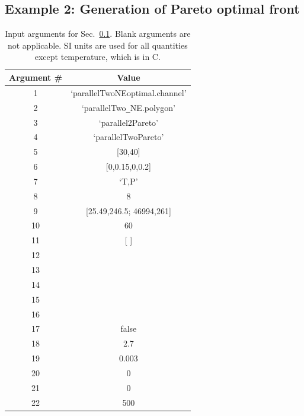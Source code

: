 \documentclass[11pt,letterpaper]{article}
\begin{document}
\subsection{Example 2: Generation of Pareto optimal front}
\label{subsec_Pareto_parallelTwo}
\begin{table}[!h]
\caption{Input arguments for Sec.\ \ref{subsec_Pareto_parallelTwo}.  Blank arguments are not applicable. SI units are used for all quantities except temperature, which is in \degree C.}
\label{tab_generate_pareto_front_inputs1}
\centering
\begin{tabular}{|c|c|}
\hline
Argument \# & Value \\
\hline
1 & `parallelTwoNEoptimal.channel'\\
\hline
2 & `parallelTwo\texttt{\_}NE.polygon' \\
\hline
3 & `parallel2Pareto' \\
\hline
4 &  `parallelTwoPareto' \\
\hline
5 & [30,40] \\
\hline
6 & [0,0.15,0,0.2] \\
\hline
7 & `T,P' \\
\hline
8 & 8 \\
\hline
9 & [25.49,246.5; 46994,261]\\
\hline
10 & 60 \\
\hline
11 & [ ] \\
\hline
12 & \\
\hline
13 & \\
\hline
14 & \\
\hline
15 & \\
\hline
16 & \\
\hline
17 & false \\
\hline 
18 & 2.7 \\
\hline 
19 & 0.003 \\
\hline
20 & 0 \\
\hline 
21 & 0 \\
\hline
22 & 500  \\
\hline
\end{tabular}
\end{table}
\end{document}
